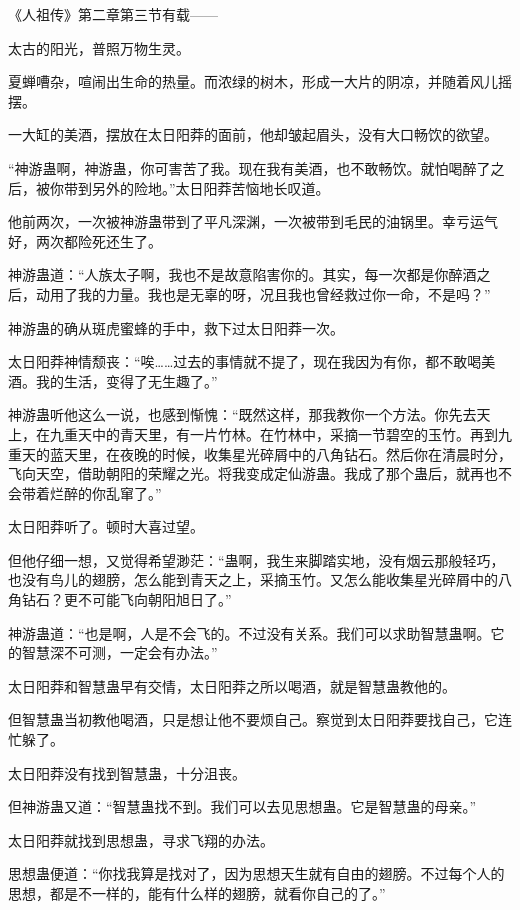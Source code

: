 
\begin{this_body}

《人祖传》第二章第三节有载——

太古的阳光，普照万物生灵。

夏蝉嘈杂，喧闹出生命的热量。而浓绿的树木，形成一大片的阴凉，并随着风儿摇摆。

一大缸的美酒，摆放在太日阳莽的面前，他却皱起眉头，没有大口畅饮的欲望。

“神游蛊啊，神游蛊，你可害苦了我。现在我有美酒，也不敢畅饮。就怕喝醉了之后，被你带到另外的险地。”太日阳莽苦恼地长叹道。

他前两次，一次被神游蛊带到了平凡深渊，一次被带到毛民的油锅里。幸亏运气好，两次都险死还生了。

神游蛊道：“人族太子啊，我也不是故意陷害你的。其实，每一次都是你醉酒之后，动用了我的力量。我也是无辜的呀，况且我也曾经救过你一命，不是吗？”

神游蛊的确从斑虎蜜蜂的手中，救下过太日阳莽一次。

太日阳莽神情颓丧：“唉……过去的事情就不提了，现在我因为有你，都不敢喝美酒。我的生活，变得了无生趣了。”

神游蛊听他这么一说，也感到惭愧：“既然这样，那我教你一个方法。你先去天上，在九重天中的青天里，有一片竹林。在竹林中，采摘一节碧空的玉竹。再到九重天的蓝天里，在夜晚的时候，收集星光碎屑中的八角钻石。然后你在清晨时分，飞向天空，借助朝阳的荣耀之光。将我变成定仙游蛊。我成了那个蛊后，就再也不会带着烂醉的你乱窜了。”

太日阳莽听了。顿时大喜过望。

但他仔细一想，又觉得希望渺茫：“蛊啊，我生来脚踏实地，没有烟云那般轻巧，也没有鸟儿的翅膀，怎么能到青天之上，采摘玉竹。又怎么能收集星光碎屑中的八角钻石？更不可能飞向朝阳旭日了。”

神游蛊道：“也是啊，人是不会飞的。不过没有关系。我们可以求助智慧蛊啊。它的智慧深不可测，一定会有办法。”

太日阳莽和智慧蛊早有交情，太日阳莽之所以喝酒，就是智慧蛊教他的。

但智慧蛊当初教他喝酒，只是想让他不要烦自己。察觉到太日阳莽要找自己，它连忙躲了。

太日阳莽没有找到智慧蛊，十分沮丧。

但神游蛊又道：“智慧蛊找不到。我们可以去见思想蛊。它是智慧蛊的母亲。”

太日阳莽就找到思想蛊，寻求飞翔的办法。

思想蛊便道：“你找我算是找对了，因为思想天生就有自由的翅膀。不过每个人的思想，都是不一样的，能有什么样的翅膀，就看你自己的了。”


\end{this_body}
